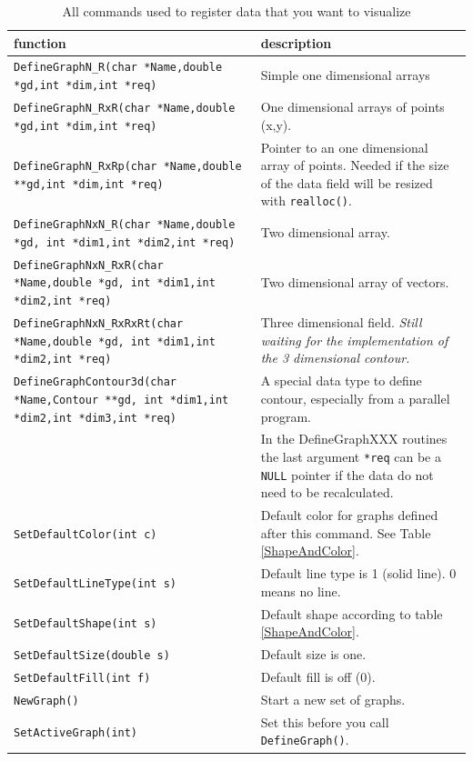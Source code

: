 \documentclass[12pt,letterpaper]{article}
\begin{document}
\begin{table}
\begin{center}
\begin{tabular}{|p{}|p{}|}
\hline
function & description\\
\hline
\texttt{DefineGraphN\_R(char *Name,double *gd,int *dim,int *req)}&
Simple one dimensional arrays\\
\texttt{DefineGraphN\_RxR(char *Name,double *gd,int *dim,int *req)}&
One dimensional arrays of points (x,y).\\
\texttt{DefineGraphN\_RxRp(char *Name,double **gd,int *dim,int *req)}&
Pointer to an one dimensional array of points. Needed if the size of
the data field will be resized with \texttt{realloc()}.\\
\texttt{DefineGraphNxN\_R(char *Name,double *gd,
                      int *dim1,int *dim2,int *req)}& Two dimensional array.\\
\texttt{DefineGraphNxN\_RxR(char *Name,double *gd,
                      int *dim1,int *dim2,int *req)}& Two dimensional
array of vectors.\\
\texttt{DefineGraphNxN\_RxRxRt(char *Name,double *gd,
                      int *dim1,int *dim2,int *req)}& Three
dimensional field. \textit{Still waiting for the implementation of the
 3 dimensional contour.}\\
\texttt{DefineGraphContour3d(char *Name,Contour **gd,
                      int *dim1,int *dim2,int *dim3,int *req)}& A
special data type to define contour, especially from a parallel program.\\
&In the DefineGraphXXX routines the last argument \texttt{*req} can be
a \texttt{NULL} pointer if the data do not need to be recalculated.\\
\hline
\texttt{SetDefaultColor(int c)}&Default color for graphs
defined after this command. See Table \ref{ShapeAndColor}.\\
\texttt{SetDefaultLineType(int s)}& Default line type is 1 (solid
line). 0 means no line. \\
\texttt{SetDefaultShape(int s)}& Default shape according to table 
\ref{ShapeAndColor}.\\
\texttt{SetDefaultSize(double s)}& Default size is one.\\
\texttt{SetDefaultFill(int f)}& Default fill is off (0).\\
\hline
\texttt{NewGraph()}& Start a new set of graphs.\\
\texttt{SetActiveGraph(int)}& Set this before you call 
\texttt{DefineGraph()}.\\
\hline
\end{tabular}
\end{center}
\caption{All commands used to register data that you want to
  visualize}
\label{graphcommands}
\end{table}
\end{document}
